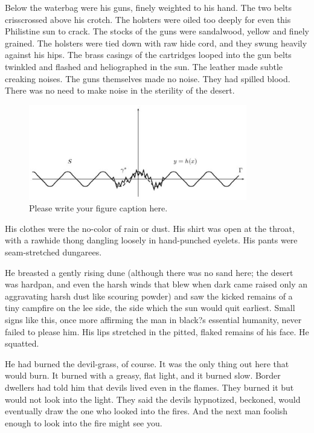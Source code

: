 \documentclass[
11pt,%
tightenlines,%
twoside,%
onecolumn,%
nofloats,%
nobibnotes,%
nofootinbib,%
superscriptaddress,%
noshowpacs,%
centertags]%
{revtex4}
\begin{document}
Below the waterbag were his guns, finely weighted to his hand. The two belts crisscrossed above his crotch. The holsters were oiled too deeply for even this Philistine sun to crack. The stocks of the guns were sandalwood, yellow and finely grained. The holsters were tied down with raw hide cord, and they swung heavily against his hips. The brass casings of the cartridges looped into the gun belts twinkled and flashed and heliographed in the sun. The leather made subtle creaking noises. The guns themselves made no noise. They had spilled blood. There was no need to make noise in the sterility of the desert.

\begin{figure}[h]
\setcaptionmargin{5mm}
\onelinecaptionstrue  %
\includegraphics[width=0.85\textwidth]{deform.eps}
\caption{Please write your figure caption here.}\label{fig:1}
\end{figure}

His clothes were the no-color of rain or dust. His shirt was open at the throat, with a rawhide thong dangling loosely in hand-punched eyelets. His pants were seam-stretched dungarees.

He breasted a gently rising dune (although there was no sand here; the desert was hardpan, and even the harsh winds that blew when dark came raised only an aggravating harsh dust like scouring powder) and saw the kicked remains of a tiny campfire on the lee side, the side which the sun would quit earliest. Small signs like this, once more affirming the man in black?s essential humanity, never failed to please him. His lips stretched in the pitted, flaked remains of his face. He squatted.

He had burned the devil-grass, of course. It was the only thing out here that would burn. It burned with a greasy, flat light, and it burned slow. Border dwellers had told him that devils lived even in the flames. They burned it but would not look into the light. They said the devils hypnotized, beckoned, would eventually draw the one who looked into the fires. And the next man foolish enough to look into the fire might see you.
\end{document}
